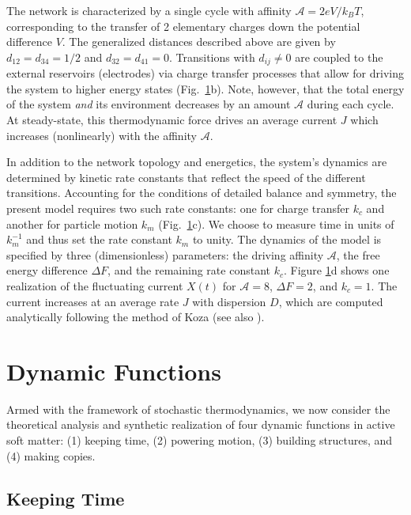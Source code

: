 \begin{appendices}
\begin{figure}[p!]
    \label{fig:KeepingTime}
\end{figure}

The network is characterized by a single cycle with affinity $\mathcal{A}= 2 e V / k_B T$, corresponding to the transfer of 2 elementary charges down the potential difference $V$. The generalized distances described above are given by $d_{12}=d_{34}=1/2$ and $d_{32}=d_{41}=0$.  Transitions with $d_{ij}\neq0$ are coupled to the external reservoirs (electrodes) via charge transfer processes that allow for driving the system to higher energy states (Fig.~\ref{fig:KeepingTime}b).  Note, however, that the total energy of the system \emph{and} its environment decreases by an amount $\mathcal{A}$ during each cycle.  At steady-state, this thermodynamic force drives an average current $J$ which increases (nonlinearly) with the affinity $\mathcal{A}$.    

In addition to the network topology and energetics, the system's dynamics are determined by kinetic rate constants that reflect the speed of the different transitions. Accounting for the conditions of detailed balance and symmetry, the present model requires two such rate constants: one for charge transfer $k_c$ and another for particle motion $k_m$ (Fig.~\ref{fig:KeepingTime}c). We choose to measure time in units of $k_m^{-1}$ and thus set the rate constant $k_m$ to unity. The dynamics of the model is specified by three (dimensionless) parameters: the driving affinity $\mathcal{A}$, the free energy difference $\Delta F$, and the remaining rate constant $k_c$.  Figure \ref{fig:KeepingTime}d shows one realization of the fluctuating current $X(t)$ for $\mathcal{A}=8$, $\Delta F=2$, and $k_c= 1$.  The current increases at an average rate $J$ with dispersion $D$, which are computed analytically following the method of Koza \cite{koza1999general} (see also \cite{Pietzonka2016b}).

\section{Dynamic Functions}

Armed with the framework of stochastic thermodynamics, we now consider the theoretical analysis and synthetic realization of four dynamic functions in active soft matter: (1) keeping time, (2) powering motion, (3) building structures, and (4) making copies.

\subsection{Keeping Time}


\end{appendices}
